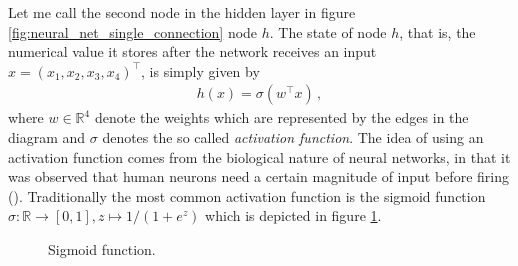 Let me call the second node in the hidden layer in figure
\ref{fig:neural_net_single_connection} node $h$. The state of node $h$, that is, the
numerical value it stores after the network receives an input $x = (x_1, x_2, x_3,
x_4)^\top$, is simply given by
\begin{align*}
    h(x) = \sigma(w^\top x) \,,
\end{align*}
where $w \in \mathbb{R}^4$ denote the weights which are represented by the edges in the
diagram and $\sigma$ denotes the so called \emph{activation function}. The idea of using
an activation function comes from the biological nature of neural networks, in that it
was observed that human neurons need a certain magnitude of input before firing
(\cite{Goodfellow.2016}). Traditionally the most common activation function is the
sigmoid function $\sigma: \mathbb{R} \to [0, 1], z \mapsto {1}/{(1 + e^z)}$ which is
depicted in figure \ref{fig:sigmoid_function}.

\begin{figure}[!ht]
\centering
{}
\caption{Sigmoid function.}\label{fig:sigmoid_function}
\end{figure}

